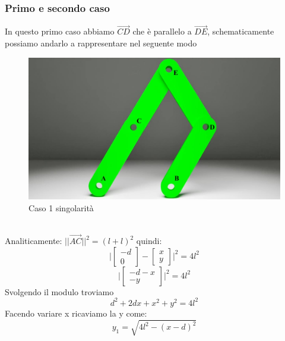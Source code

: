 \subsubsection*{Primo e secondo caso}
In questo primo caso abbiamo $\overrightarrow{CD}$ che è parallelo a $\overrightarrow{DE}$, schematicamente possiamo andarlo a rappresentare nel seguente modo
\begin{figure}[ht]
	\begin{center}
		\includegraphics[scale=0.3]{Immagini/Singolarity/1}
		\caption{Caso 1 singolarità}
	\end{center}
\end{figure}
\\Analiticamente: $||\overrightarrow{AC}||^2 = (l+l)^2$ quindi: 
\begin{equation*}
	\Bigg| \begin{bmatrix}
		-d  \\ 0
	\end{bmatrix} - \begin{bmatrix}
	x \\ y
\end{bmatrix}\bigg|^2 = 4l^2
\end{equation*}
\begin{equation*}
\bigg|	\begin{bmatrix}
		-d-x \\ -y
	\end{bmatrix}\Bigg|^2 = 4l^2
\end{equation*}
Svolgendo il modulo troviamo 
\begin{equation*}
	d^2 + 2dx + x^2 +y^2 = 4l^2
\end{equation*}
Facendo variare x ricaviamo la y come:
\begin{equation}
    y_1 = \sqrt{4l^2-(x-d)^2}
\end{equation}

